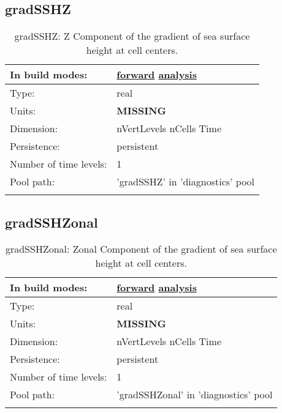 \subsection[gradSSHZ]{gradSSHZ}
\label{subsec:var_sec_diagnostics_gradSSHZ}
\begin{center}
\begin{longtable}{| p{2.0in} | p{4.0in} |}
        \hline 
        In build modes: & \hyperref[subsec:forward_var_tab_diagnostics]{forward} \hyperref[subsec:analysis_var_tab_diagnostics]{analysis} \\
        \hline 
        Type: & real \\
        \hline 
        Units: & {\bf \color{red} MISSING} \\
        \hline 
        Dimension: & nVertLevels nCells Time \\
        \hline 
        Persistence: & persistent \\
        \hline 
        Number of time levels: & 1 \\
        \hline 
            Pool path: & 'gradSSHZ' in 'diagnostics' pool
 \\
		 \hline 
    \caption{gradSSHZ: Z Component of the gradient of sea surface height at cell centers.}
\end{longtable}
\end{center}
\subsection[gradSSHZonal]{gradSSHZonal}
\label{subsec:var_sec_diagnostics_gradSSHZonal}
\begin{center}
\begin{longtable}{| p{2.0in} | p{4.0in} |}
        \hline 
        In build modes: & \hyperref[subsec:forward_var_tab_diagnostics]{forward} \hyperref[subsec:analysis_var_tab_diagnostics]{analysis} \\
        \hline 
        Type: & real \\
        \hline 
        Units: & {\bf \color{red} MISSING} \\
        \hline 
        Dimension: & nVertLevels nCells Time \\
        \hline 
        Persistence: & persistent \\
        \hline 
        Number of time levels: & 1 \\
        \hline 
            Pool path: & 'gradSSHZonal' in 'diagnostics' pool
 \\
		 \hline 
    \caption{gradSSHZonal: Zonal Component of the gradient of sea surface height at cell centers.}
\end{longtable}
\end{center}
